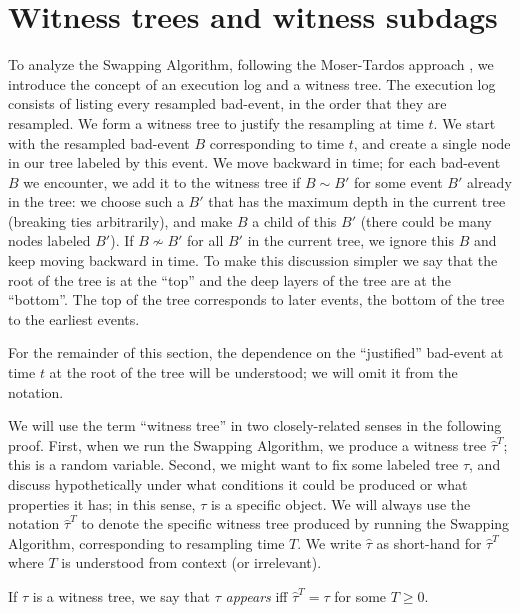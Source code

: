 \section{Witness trees and witness subdags}
\label{witness-tree-sec}
To analyze the Swapping Algorithm, following the Moser-Tardos approach \cite{moser-tardos}, we introduce the concept of an execution log and a witness tree. The execution log consists of listing every resampled bad-event, in the order that they are resampled. We form a witness tree to justify the resampling at time $t$. We start with the resampled bad-event $B$ corresponding to time $t$, and create a single node in our tree labeled by this event. 
We move backward in time; for each bad-event $B$ we encounter, we add it to the witness tree if $B \sim B'$ for some event $B'$ already in the tree: we choose such a $B'$ that has the maximum depth in the current tree (breaking ties arbitrarily), and make $B$ a child of this $B'$ (there could be many nodes labeled $B'$). If $B \not\sim B'$ for all $B'$ in the current tree, we ignore this $B$ and keep moving backward in time. 
To make this discussion simpler we say that the root of the tree is at the ``top'' and the deep layers of the tree are at the ``bottom''. The top of the tree corresponds to later events, the bottom of the tree to the earliest events.


For the remainder of this section, the dependence on the ``justified'' bad-event at time $t$ at the root of the tree will be understood; we will omit it from the notation.

We will use the term ``witness tree'' in two closely-related senses in the following proof. First, when we run the Swapping Algorithm, we produce a witness tree $\hat \tau^T$; this is a random variable. Second, we might want to fix some labeled tree $\tau$, and discuss hypothetically under what conditions it could be produced or what properties it has; in this sense, $\tau$ is a specific object. We will always use the notation $\hat \tau^T$ to denote the specific witness tree produced by running the Swapping Algorithm, corresponding to resampling time $T$. We write $\hat \tau$ as short-hand for $\hat \tau^T$ where $T$ is understood from context (or irrelevant).

If $\tau$ is a witness tree, we say that $\tau$ \emph{appears} iff $\hat \tau^T = \tau$ for some $T \geq 0$.

